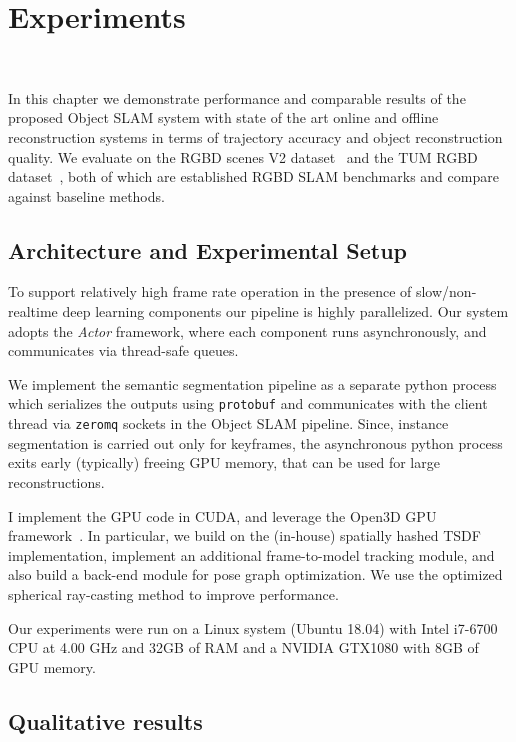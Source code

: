 \chapter{Experiments}~\label{chap:experiments}

In this chapter we demonstrate performance and comparable results of the proposed Object SLAM system with state of the art online and offline reconstruction systems in terms of trajectory accuracy and object reconstruction quality. We evaluate on the RGBD scenes V2 dataset~\cite{laiUnsupervisedFeatureLearning2014} and the TUM RGBD dataset~\cite{sturmBenchmarkEvaluationRGBD2012}, both of which are established RGBD SLAM benchmarks and compare against baseline methods.

\section{Architecture and Experimental Setup}


To support relatively high frame rate operation in the presence of slow/non-realtime deep learning components our pipeline is highly parallelized. Our system adopts the \textit{Actor} framework, where each component runs asynchronously, and communicates via thread-safe queues.

We implement the semantic segmentation pipeline as a separate python process which serializes the outputs using \texttt{protobuf} and communicates with the client thread via \texttt{zeromq} sockets in the Object SLAM pipeline. Since, instance segmentation is carried out only for keyframes, the asynchronous python process exits early (typically) freeing GPU memory, that can be used for large reconstructions.

I implement the GPU code in CUDA, and leverage the Open3D GPU framework~\cite{dongGPUAcceleratedRobust2019}. In particular, we build on the (in-house) spatially hashed TSDF implementation, implement an additional frame-to-model tracking module, and also build a back-end module for pose graph optimization. We use the optimized spherical ray-casting method to improve performance.

Our experiments were run on a Linux system (Ubuntu 18.04) with Intel i7-6700 CPU at 4.00 GHz and 32GB of RAM and a NVIDIA GTX1080 with 8GB of GPU memory.

\section{Qualitative results}

